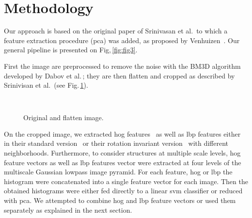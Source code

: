 \graphicspath{ {./content/method/figures/} }

\section{Methodology}\label{sec:method}

Our approach is based on the original paper of Srinivasan et al.\,\cite{srinivasan2014fully} to which a feature extraction procedure (\gls{pca}) was added, as proposed by Venhuizen~\cite{venhuizen2015automated}.
Our general pipeline is presented on Fig,\,\ref{fig:fig3}.

First the image are preprocessed to remove the noise with the BM3D algorithm developed by Dabov et al.\,\cite{dabov2007image}; they are then flatten and cropped as described by Srinivisan et al.\,\cite{srinivasan2014fully} (see Fig.\,\ref{fig:fig4}).
\begin{figure}
\centering
{}\
\caption{Original and flatten image.}
\label{fig:fig4}
\end{figure}
On the cropped image, we extracted \gls{hog} features~\cite{dalal2005histograms} as well as \gls{lbp} features either in their standard version~\cite{ojala2002multiresolution} or their rotation invariant version~\cite{zhao2012rotation} with different neighborhoods.
Furthermore, to consider structures at multiple scale levels, \gls{hog} feature vectors as well as \gls{lbp} features vector were extracted at four levels of the multiscale Gaussian lowpass image pyramid.
For each feature, \gls{hog} or \gls{lbp} the histogram were concatenated into a single feature vector for each image.
Then the obtained histograms were either fed directly to a linear \gls{svm} classifier or reduced with \gls{pca}. 
We attempted to combine \gls{hog} and \gls{lbp} feature vectors or used them separately as explained in the next section.
